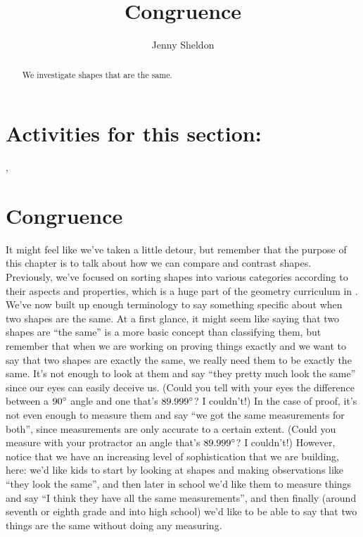 \documentclass{ximera}
\title{Congruence}
\author{Jenny Sheldon}
\begin{document}
\begin{abstract}
We investigate shapes that are the same.
\end{abstract}
\maketitle

\section{Activities for this section:} 
, 

\section{Congruence}

It might feel like we've taken a little detour, but remember that the purpose of this chapter is to talk about how we can compare and contrast shapes. Previously, we've focused on sorting shapes into various categories according to their aspects and properties, which is a huge part of the geometry curriculum in .  We've now built up enough terminology to say something specific about when two shapes are the same. At a first glance, it might seem like saying that two shapes are ``the same'' is a more basic concept than classifying them, but remember that when we are working on proving things exactly and we want to say that two shapes are exactly the same, we really need them to be exactly the same. It's not enough to look at them and say ``they pretty much look the same'' since our eyes can easily deceive us. (Could you tell with your eyes the difference between a $90\degree$ angle and one that's $89.999\degree$? I couldn't!) In the case of proof, it's not even enough to measure them and say ``we got the same measurements for both'', since measurements are only accurate to a certain extent. (Could you measure with your protractor an angle that's $89.999\degree$? I couldn't!) However, notice that we have an increasing level of sophistication that we are building, here: we'd like kids to start by looking at shapes and making observations like ``they look the same'', and then later in school we'd like them to measure things and say ``I think they have all the same measurements'', and then finally (around seventh or eighth grade and into high school) we'd like to be able to say that two things are the same without doing any measuring. 
\end{document}
